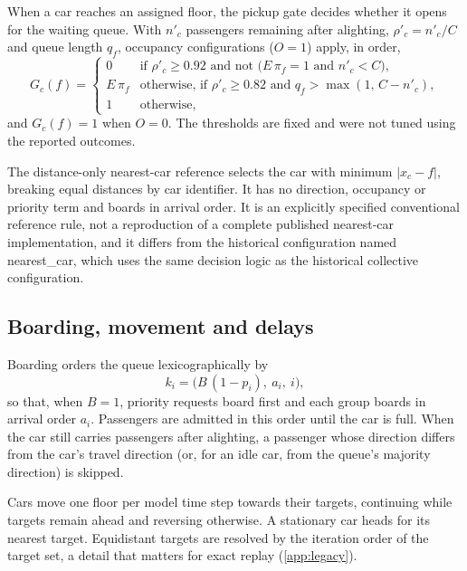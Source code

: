 When a car reaches an assigned floor, the pickup gate decides whether it opens for the waiting queue. With $n'_c$ passengers remaining after alighting, $\rho'_c=n'_c/C$ and queue length $q_f$, occupancy configurations ($O=1$) apply, in order,
\begin{equation}
G_c(f)=\begin{cases}
0 & \text{if } \rho'_c\ge 0.92 \text{ and not } \bigl(E\,\pi_f=1 \text{ and } n'_c<C\bigr),\\
E\,\pi_f & \text{otherwise, if } \rho'_c\ge 0.82 \text{ and } q_f>\max(1,\,C-n'_c),\\
1 & \text{otherwise},
\end{cases}
\label{eq:pickup}
\end{equation}
and $G_c(f)=1$ when $O=0$. The thresholds are fixed and were not tuned using the reported outcomes.

The distance-only nearest-car reference selects the car with minimum $|x_c-f|$, breaking equal distances by car identifier. It has no direction, occupancy or priority term and boards in arrival order. It is an explicitly specified conventional reference rule, not a reproduction of a complete published nearest-car implementation, and it differs from the historical configuration named nearest\_car, which uses the same decision logic as the historical collective configuration.

\subsection{Boarding, movement and delays}\label{boarding-and-movement}

Boarding orders the queue lexicographically by
\begin{equation}
k_i=\bigl(B\,(1-p_i),\ a_i,\ i\bigr),
\label{eq:boarding}
\end{equation}
so that, when $B=1$, priority requests board first and each group boards in arrival order $a_i$. Passengers are admitted in this order until the car is full. When the car still carries passengers after alighting, a passenger whose direction differs from the car's travel direction (or, for an idle car, from the queue's majority direction) is skipped.

Cars move one floor per model time step towards their targets, continuing while targets remain ahead and reversing otherwise. A stationary car heads for its nearest target. Equidistant targets are resolved by the iteration order of the target set, a detail that matters for exact replay (\ref{app:legacy}).

